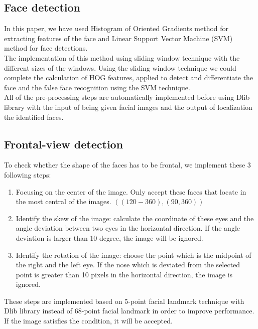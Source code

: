 \documentclass[journal, twocolumn]{IEEEtran}
\begin{document}
\subsection{Face detection}
\label{face-detection}
In this paper, we have used Histogram of Oriented Gradients method for extracting features of the face and Linear Support Vector Machine (SVM) method for face detections.\\
The implementation of this method using sliding window technique with the different sizes of the windows. Using the sliding window technique we could complete the calculation of HOG features, applied to detect and differentiate the face and the false face recognition using the SVM technique.\\
All of the pre-processing steps are automatically implemented before using Dlib library with the input of being given facial images and the output of localization the identified faces.\\

\subsection{Frontal-view detection}
\label{frontal-view-detection}
To check whether the shape of the faces has to be frontal, we implement these 3 following steps:
\begin{enumerate}[Step 1.]
	\item Focusing on the center of the image. Only accept these faces that locate in the most central of the images. $((120-360), (90,360))$
	\item Identify the skew of the image: calculate the coordinate of these eyes and the angle deviation between two eyes in the horizontal direction. If the angle deviation is larger than 10 degree, the image will be ignored.
	\item Identify the rotation of the image: choose the point which is the midpoint of the right and the left eye. If the nose which is deviated from the selected point is greater than 10 pixels in the horizontal direction, the image is ignored.
\end{enumerate}
These steps are implemented based on 5-point facial landmark technique with Dlib library instead of 68-point facial landmark in order to improve performance. If the image satisfies the condition, it will be accepted.
\end{document}

